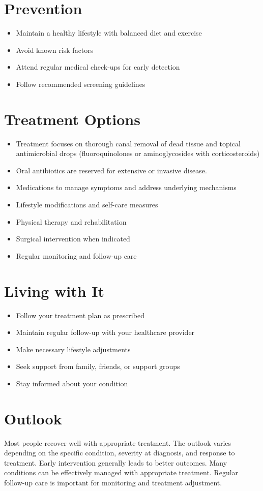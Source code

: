 \section{Prevention}
\begin{itemize}[noitemsep]
  \item Maintain a healthy lifestyle with balanced diet and exercise
  \item Avoid known risk factors
  \item Attend regular medical check-ups for early detection
  \item Follow recommended screening guidelines
\end{itemize}
\section{Treatment Options}
\begin{itemize}[noitemsep]
  \item Treatment focuses on thorough canal removal of dead tissue and topical antimicrobial drops (fluoroquinolones or aminoglycosides with corticosteroids)
  \item Oral antibiotics are reserved for extensive or invasive disease.
  \item Medications to manage symptoms and address underlying mechanisms
  \item Lifestyle modifications and self-care measures
  \item Physical therapy and rehabilitation
  \item Surgical intervention when indicated
  \item Regular monitoring and follow-up care
\end{itemize}
\section{Living with It}
\begin{itemize}[noitemsep]
  \item Follow your treatment plan as prescribed
  \item Maintain regular follow-up with your healthcare provider
  \item Make necessary lifestyle adjustments
  \item Seek support from family, friends, or support groups
  \item Stay informed about your condition
\end{itemize}
\section{Outlook}
Most people recover well with appropriate treatment. The outlook varies depending on the specific condition, severity at diagnosis, and response to treatment. Early intervention generally leads to better outcomes. Many conditions can be effectively managed with appropriate treatment. Regular follow-up care is important for monitoring and treatment adjustment.
